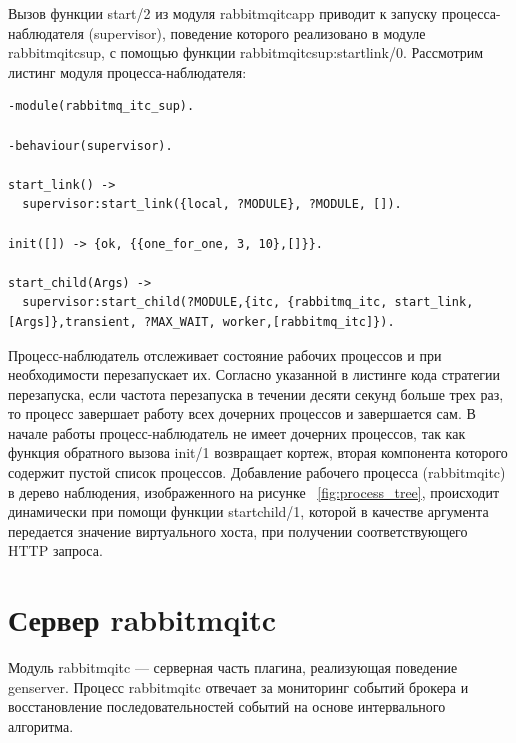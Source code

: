 Вызов функции start/2 из модуля rabbitmq\underline{\hspace{0.25cm}}itc\underline{\hspace{0.25cm}}app приводит к запуску процесса-наблюдателя (supervisor), поведение которого реализовано в модуле rabbitmq\underline{\hspace{0.25cm}}itc\underline{\hspace{0.25cm}}sup, с помощью функции rabbitmq\underline{\hspace{0.25cm}}itc\underline{\hspace{0.25cm}}sup:start\underline{\hspace{0.25cm}}link/0. Рассмотрим листинг модуля процесса-наблюдателя:
\begin{lstlisting}
-module(rabbitmq_itc_sup).

-behaviour(supervisor).

start_link() -> 
  supervisor:start_link({local, ?MODULE}, ?MODULE, []).

init([]) -> {ok, {{one_for_one, 3, 10},[]}}.

start_child(Args) ->
  supervisor:start_child(?MODULE,{itc, {rabbitmq_itc, start_link, [Args]},transient, ?MAX_WAIT, worker,[rabbitmq_itc]}).
\end{lstlisting}
Процесс-наблюдатель отслеживает состояние рабочих процессов и при необходимости перезапускает их. Согласно указанной в листинге кода стратегии перезапуска, если частота перезапуска в течении десяти секунд больше трех раз, то процесс завершает работу всех дочерних процессов и завершается сам. В начале работы процесс-наблюдатель не имеет дочерних процессов, так как функция обратного вызова init/1 возвращает кортеж, вторая компонента которого содержит пустой список процессов. Добавление рабочего процесса (rabbitmq\underline{\hspace{0.25cm}}itc) в дерево наблюдения, изображенного на рисунке ~\ref{fig:process_tree}, происходит динамически при помощи функции  start\underline{\hspace{0.25cm}}child/1, которой в качестве аргумента передается значение виртуального хоста, при получении соответствующего HTTP запроса.

\section{Сервер rabbitmq\underline{\hspace{0.25cm}}itc}
Модуль rabbitmq\underline{\hspace{0.25cm}}itc --- серверная часть плагина, реализующая поведение gen\underline{\hspace{0.25cm}}server. Процесс rabbitmq\underline{\hspace{0.25cm}}itc отвечает за мониторинг событий брокера и восстановление последовательностей событий на основе интервального алгоритма.


